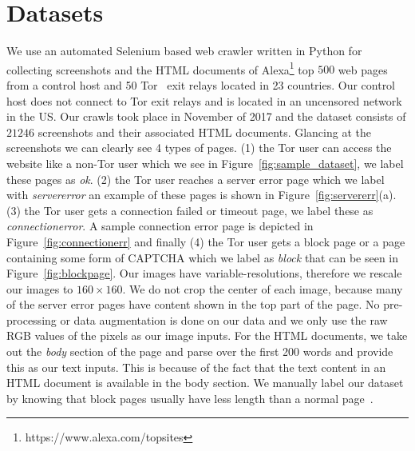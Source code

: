 \documentclass{article} %
\begin{document}
\section{Datasets} 
\label{datasets}
We use an automated Selenium based web crawler written in Python for collecting screenshots and the HTML documents of Alexa\footnote{https://www.alexa.com/topsites} top $500$ web pages from a control host and 50 Tor~\cite{tor} exit relays located in 23 countries. Our control host does not connect to Tor exit relays and is located in an uncensored network in the US. Our crawls took place in November of 2017 and the dataset consists of $21246$ screenshots and their associated HTML documents. Glancing at the screenshots we can clearly see 4 types of pages. (1) the Tor user can access the website like a non-Tor user which we see in Figure~\ref{fig:sample_dataset}, we label these pages as \textit{ok}. (2) the Tor user reaches a server error page which we label with \textit{servererror} an example of these pages is shown in Figure~\ref{fig:servererr}(a). (3) the Tor user gets a connection failed or timeout page, we label these as \textit{connectionerror}. A sample connection error page is depicted in Figure~\ref{fig:connectionerr} and finally (4) the Tor user gets a block page or a page containing some form of CAPTCHA which we label as \textit{block} that can be seen in Figure~\ref{fig:blockpage}.
Our images have variable-resolutions, therefore we rescale our images to $160\times160$. We do not crop the center of each image, because many of the server error pages have content shown in the top part of the page. No pre-processing or data augmentation is done on our data and we only use the raw RGB values of the pixels as our image inputs. For the HTML documents, we take out the \textit{body} section of the page and parse over the first 200 words and provide this as our text inputs. This is because of the fact that the text content in an HTML document is available in the body section. We manually label our dataset by knowing that block pages usually have less length than a normal page~\cite{imc14_phillipa}.
\end{document}
